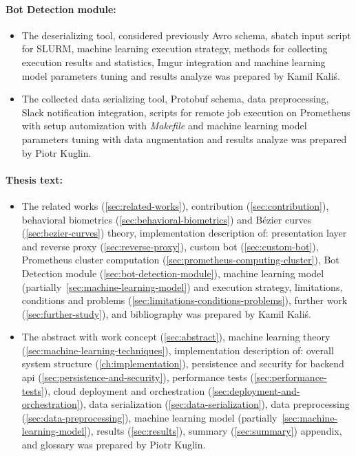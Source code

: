 \begin{minipage}{\textwidth}
    \paragraph{Bot Detection module:}
    \begin{itemize}[label=$\bullet$]
        \item The deserializing tool, considered previously Avro schema, sbatch input script for SLURM, machine learning execution strategy, methods for collecting execution results and statistics, Imgur integration and machine learning model parameters tuning and results analyze was prepared by Kamil Kaliś.
        \item The collected data serializing tool, Protobuf schema, data preprocessing, Slack notification integration, scripts for remote job execution on Prometheus with setup automization with \textit{Makefile} and machine learning model parameters tuning with data augmentation and results analyze was prepared by Piotr Kuglin.
    \end{itemize}
\end{minipage}

\begin{minipage}{\textwidth}
    \paragraph{Thesis text:}
    \begin{itemize}[label=$\bullet$]
        \item The related works (\ref{sec:related-works}), contribution (\ref{sec:contribution}), behavioral biometrics (\ref{sec:behavioral-biometrics}) and Bézier curves (\ref{sec:bezier-curves}) theory, implementation description of: presentation layer and reverse proxy (\ref{sec:reverse-proxy}), custom bot (\ref{sec:custom-bot}), Prometheus cluster computation (\ref{sec:prometheus-computing-cluster}), Bot Detection module (\ref{sec:bot-detection-module}), machine learning model (partially~\ref{sec:machine-learning-model}) and execution strategy, limitations, conditions and problems (\ref{sec:limitations-conditions-problems}), further work (\ref{sec:further-study}), and bibliography was prepared by Kamil Kaliś.
        \item The abstract with work concept (\ref{sec:abstract}), machine learning theory (\ref{sec:machine-learning-techniques}), implementation description of: overall system structure (\ref{ch:implementation}), persistence and security for backend \gls{api} (\ref{sec:persistence-and-security}), performance tests (\ref{sec:performance-tests}), cloud deployment and orchestration (\ref{sec:deployment-and-orchestration}), data serialization (\ref{sec:data-serialization}), data preprocessing (\ref{sec:data-preprocessing}), machine learning model (partially~\ref{sec:machine-learning-model}), results (\ref{sec:results}), summary (\ref{sec:summary}) appendix, and glossary was prepared by Piotr Kuglin.
    \end{itemize}
\end{minipage}
